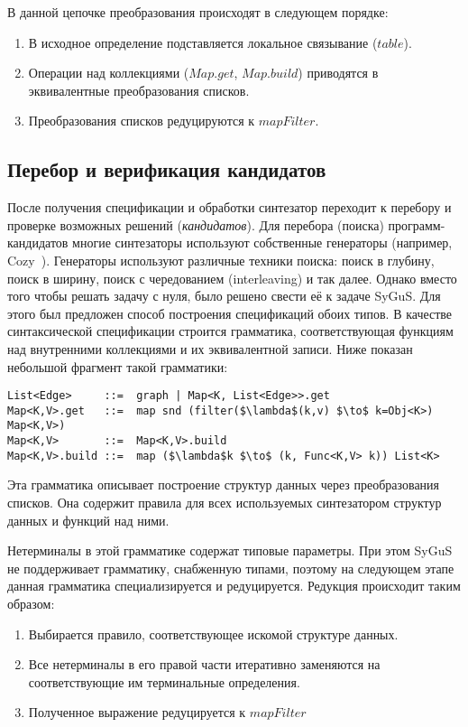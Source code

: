 \documentclass[14pt]{matmex-diploma-custom}
\begin{document}
В данной цепочке преобразования происходят в следующем порядке:
\begin{enumerate}
    \item В исходное определение подставляется локальное связывание ($table$).
    \item Операции над коллекциями ($Map.get$, $Map.build$) приводятся в эквивалентные преобразования списков.
    \item Преобразования списков редуцируются к $mapFilter$.
\end{enumerate}


\subsection{Перебор и верификация кандидатов}
После получения спецификации и обработки синтезатор переходит к перебору и проверке возможных решений (\textit{кандидатов}). Для перебора (поиска) программ-кандидатов многие синтезаторы используют собственные генераторы (например, Cozy~\cite{Cozy}). Генераторы используют различные техники поиска: поиск в глубину, поиск в ширину, поиск с чередованием (interleaving) и так далее.
Однако вместо того чтобы решать задачу с нуля, было решено свести её к задаче SyGuS. Для этого был предложен способ построения спецификаций обоих типов. В качестве синтаксической спецификации строится грамматика, соответствующая функциям над внутренними коллекциями и их эквивалентной записи. Ниже показан небольшой фрагмент такой грамматики:

\begin{lstlisting}[language=SyGuSLang, mathescape=true]
List<Edge>     ::=  graph | Map<K, List<Edge>>.get
Map<K,V>.get   ::=  map snd (filter($\lambda$(k,v) $\to$ k=Obj<K>) Map<K,V>)
Map<K,V>       ::=  Map<K,V>.build
Map<K,V>.build ::=  map ($\lambda$k $\to$ (k, Func<K,V> k)) List<K>
\end{lstlisting}

Эта грамматика описывает построение структур данных через преобразования списков. Она содержит правила для всех используемых синтезатором структур данных и функций над ними.

Нетерминалы в этой грамматике содержат типовые параметры. При этом SyGuS не поддерживает грамматику, снабженную типами, поэтому на следующем этапе данная грамматика специализируется и редуцируется. Редукция происходит таким образом:
\begin{enumerate}
    \item Выбирается правило, соответствующее искомой структуре данных.
    \item Все нетерминалы в его правой части итеративно заменяются на соответствующие им терминальные определения.
    \item Полученное выражение редуцируется к $mapFilter$
\end{enumerate}
\end{document}
